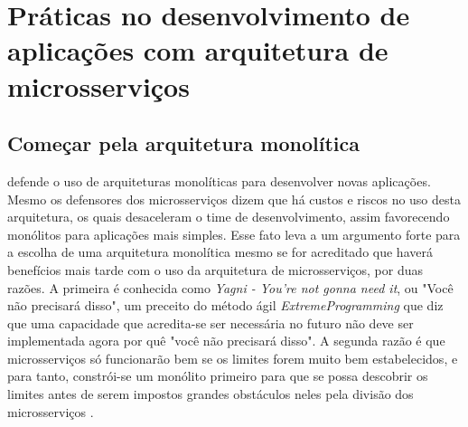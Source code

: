 \chapter{Práticas no desenvolvimento de aplicações com arquitetura de microsserviços}\label{chapter-boas-praticas}


\section{Começar pela arquitetura monolítica}


 defende o uso de arquiteturas monolíticas para desenvolver novas aplicações. Mesmo os defensores dos microsserviços dizem que há custos e riscos no uso desta arquitetura, os quais desaceleram o time de desenvolvimento, assim favorecendo monólitos para aplicações mais simples. Esse fato leva a um argumento forte para a escolha de uma arquitetura monolítica mesmo se for acreditado que haverá benefícios mais tarde com o uso da arquitetura de microsserviços, por duas razões. A primeira é conhecida como \emph{Yagni - You're not gonna need it}, ou "Você não precisará disso", um preceito do método ágil \emph{ExtremeProgramming} que diz que uma capacidade que acredita-se ser necessária no futuro não deve ser implementada agora por quê "você não precisará disso". A segunda razão é que microsserviços só funcionarão bem se os limites forem muito bem estabelecidos, e para tanto, constrói-se um monólito primeiro para que se possa descobrir os limites antes de serem impostos grandes obstáculos neles pela divisão dos microsserviços \cite{martin-fowler-monolith-first}.

